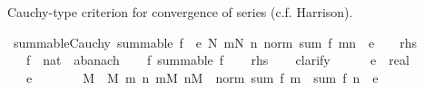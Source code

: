 \begin{isabellebody}
\begin{isamarkuptext}
Cauchy-type criterion for convergence of series (c.f. Harrison).%
\end{isamarkuptext}\isamarkuptrue%
\isamarkupfalse%
\ summable{\isacharunderscore}{\kern0pt}Cauchy{\isacharcolon}{\kern0pt}\ {\isachardoublequoteopen}summable\ f\ {\isasymlongleftrightarrow}\ {\isacharparenleft}{\kern0pt}{\isasymforall}e{\isachargreater}{\kern0pt}{}{\isachardot}{\kern0pt}\ {\isasymexists}N{\isachardot}{\kern0pt}\ {\isasymforall}m{\isasymge}N{\isachardot}{\kern0pt}\ {\isasymforall}n{\isachardot}{\kern0pt}\ norm\ {\isacharparenleft}{\kern0pt}sum\ f\ {\isacharbraceleft}{\kern0pt}m{\isachardot}{\kern0pt}{\isachardot}{\kern0pt}{\isacharless}{\kern0pt}n{\isacharbraceright}{\kern0pt}{\isacharparenright}{\kern0pt}\ {\isacharless}{\kern0pt}\ e{\isacharparenright}{\kern0pt}{\isachardoublequoteclose}\ {\isacharparenleft}{\kern0pt}\ {\isachardoublequoteopen}{\isacharunderscore}{\kern0pt}\ {\isacharequal}{\kern0pt}\ {\isacharquery}{\kern0pt}rhs{\isachardoublequoteclose}{\isacharparenright}{\kern0pt}\isanewline
\ \ \ f\ {\isacharcolon}{\kern0pt}{\isacharcolon}{\kern0pt}\ {\isachardoublequoteopen}nat\ {\isasymRightarrow}\ {\isacharprime}{\kern0pt}a{\isacharcolon}{\kern0pt}{\isacharcolon}{\kern0pt}banach{\isachardoublequoteclose}\isanewline
%
\isadelimproof
%
\endisadelimproof
%
\isatagproof
{}\isamarkupfalse%
\isanewline
\ \ \isamarkupfalse%
\ f{\isacharcolon}{\kern0pt}\ {\isachardoublequoteopen}summable\ f{\isachardoublequoteclose}\isanewline
\ \ \isamarkupfalse%
\ {\isacharquery}{\kern0pt}rhs\isanewline
\ \ \isamarkupfalse%
\ clarify\isanewline
\ \ \ \ \isamarkupfalse%
\ e\ {\isacharcolon}{\kern0pt}{\isacharcolon}{\kern0pt}\ real\isanewline
\ \ \ \ \isamarkupfalse%
\ {\isachardoublequoteopen}{}\ {\isacharless}{\kern0pt}\ e{\isachardoublequoteclose}\isanewline
\ \ \ \ \isamarkupfalse%
\ \isamarkupfalse%
\ M\ \ M{\isacharcolon}{\kern0pt}\ {\isachardoublequoteopen}{\isasymAnd}m\ n{\isachardot}{\kern0pt}\ {\isasymlbrakk}m{\isasymge}M{\isacharsemicolon}{\kern0pt}\ n{\isasymge}M{\isasymrbrakk}\ {\isasymLongrightarrow}\ norm\ {\isacharparenleft}{\kern0pt}sum\ f\ {\isacharbraceleft}{\kern0pt}{\isachardot}{\kern0pt}{\isachardot}{\kern0pt}{\isacharless}{\kern0pt}m{\isacharbraceright}{\kern0pt}\ {\isacharminus}{\kern0pt}\ sum\ f\ {\isacharbraceleft}{\kern0pt}{\isachardot}{\kern0pt}{\isachardot}{\kern0pt}{\isacharless}{\kern0pt}n{\isacharbraceright}{\kern0pt}{\isacharparenright}{\kern0pt}\ {\isacharless}{\kern0pt}\ e{\isachardoublequoteclose}\isanewline

\end{isabellebody}
